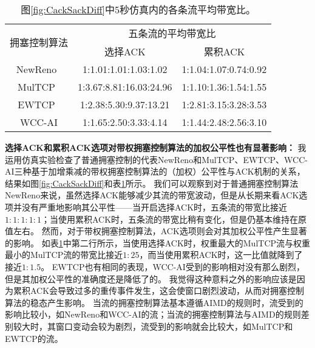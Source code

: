 \documentclass[winfonts]{njuthesis}
\begin{document}
\begin{table}[h]
	\caption{图\ref{fig:CackSackDiff}中5秒仿真内的各条流平均带宽比。}
	\label{tab:CackSackDiff}
	\centering
	\begin{tabular}{c|cc}
		\hline
		\multirow{2}{*}{拥塞控制算法} & \multicolumn{2}{c}{五条流的平均带宽比} \\
		\cline{2-3} & 选择ACK & 累积ACK \\
		\hline
		NewReno~\cite{Henderson2012NewReno} & 1:1.01:1.01:1.03:1.02 & 1:1.04:1.07:0.74:0.92 \\
		MulTCP~\cite{crowcroft1998differentiated} & 1:3.67:8.81:16.03:24.96 & 1:1.10:1.36:1.54:1.55 \\
		EWTCP~\cite{Honda2009EWTCP} & 1:2.38:5.30:9.37:13.21 & 1:2.81:3.15:3.28:3.53\\
		WCC-AI & 1:1.65:2.50:3.33:4.14 & 1:1.44:2.48:2.56:3.10\\
		\hline
	\end{tabular}
\end{table}

\textbf{选择ACK和累积ACK选项对带权拥塞控制算法的加权公平性也有显著影响：}
我运用仿真实验检查了普通拥塞控制的代表NewReno和MulTCP、EWTCP、WCC-AI三种基于加增乘减的带权拥塞控制算法的（加权）公平性与ACK机制的关系，结果如图\ref{fig:CackSackDiff}和表\ref{tab:CackSackDiff}所示。
我们可以观察到对于普通拥塞控制算法NewReno来说，虽然选择ACK能够减少其流的带宽波动，但是从长期来看ACK选项并没有严重地影响其公平性——当开启选择ACK时，五条流的带宽比接近$1:1:1:1:1$；当使用累积ACK时，五条流的带宽比稍有变化，但是仍基本维持在原值左右。
然而，对于带权拥塞控制算法，ACK选项则会对其加权公平性产生显著的影响。
如表\ref{tab:CackSackDiff}中第二行所示，当使用选择ACK时，权重最大的MulTCP流与权重最小的MulTCP流的带宽比接近$1:25$，而当使用累积ACK时，这一比值就降到了接近$1:1.5$。
EWTCP也有相同的表现，WCC-AI受到的影响相对没有那么剧烈，但是其加权公平性的准确度还是降低了的。
我觉得这种意料之外的影响应该是因为累积ACK会导致过多的重传事件发生\cite{Mathis1996SACK}，这会使窗口剧烈波动，从而对拥塞控制算法的稳态产生影响。
当流的拥塞控制算法基本遵循AIMD的规则时，流受到的影响比较小，如NewReno和WCC-AI的流；当流的拥塞控制算法与AIMD的规则差别较大时，其窗口变动会较为剧烈，流受到的影响就会比较大，如MulTCP和EWTCP的流。
\end{document}
